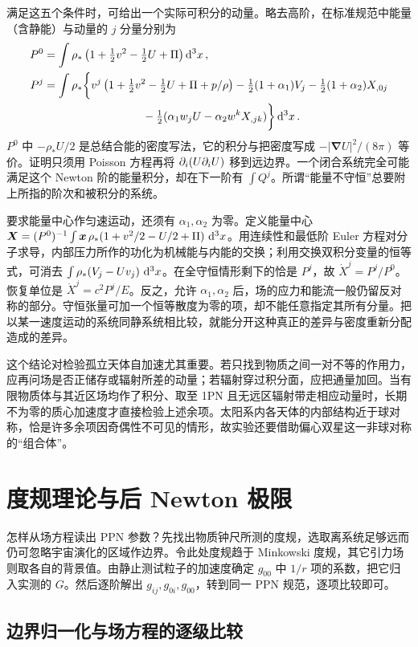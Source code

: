 满足这五个条件时，可给出一个实际可积分的动量。略去高阶，在标准规范中能量（含静能）与动量的 $j$ 分量分别为
\begin{align*}
 P^0&=\int\rho_*\left(1+\tfrac12v^2-\tfrac12 U+\Pi\right)\d[3]{x},\\
 P^j&=\int\rho_*\bigg\{ v^j\left(1+\tfrac12v^2-\tfrac12 U+\Pi+p/\rho\right)
       -\tfrac12(1+\alpha_1)V_j-\tfrac12(1+\alpha_2)X_{,0j}\\
    &\hspace{31mm}-\tfrac12(\alpha_1 w_jU-\alpha_2w^kX_{,jk})\bigg\}\d[3]{x}.
\end{align*}
$P^0$ 中 $-\rho_*U/2$ 是总结合能的密度写法，它的积分与把密度写成 $-|\bm\nabla U|^2/(8\pi)$ 等价。证明只须用 Poisson 方程再将 $\partial_i(U\partial_iU)$ 移到远边界。一个闭合系统完全可能满足这个 Newton 阶的能量积分，却在下一阶有 $\int Q^j$。所谓“能量不守恒”总要附上所指的阶次和被积分的系统。

要求能量中心作匀速运动，还须有 $\alpha_1,\alpha_2$ 为零。定义能量中心 $\bm X=(P^0)^{-1}\int \bm x\,\rho_*(1+v^2/2-U/2+\Pi)\,\dd[3]{x}$。用连续性和最低阶 Euler 方程对分子求导，内部压力所作的功化为机械能与内能的交换；利用交换双积分变量的恒等式，可消去 $\int\rho_*(V_j-Uv_j)\,\dd[3]{x}$。在全守恒情形剩下的恰是 $P^j$，故 $\dot X^j=P^j/P^0$。恢复单位是 $\dot X^j=c^2P^j/E$。反之，允许 $\alpha_1,\alpha_2$ 后，场的应力和能流一般仍留反对称的部分。守恒张量可加一个恒等散度为零的项，却不能任意指定其所有分量。把以某一速度运动的系统同静系统相比较，就能分开这种真正的差异与密度重新分配造成的差异。

这个结论对检验孤立天体自加速尤其重要。若只找到物质之间一对不等的作用力，应再问场是否正储存或辐射所差的动量；若辐射穿过积分面，应把通量加回。当有限物质体与其近区场均作了积分、取至 1PN 且无远区辐射带走相应动量时，长期不为零的质心加速度才直接检验上述余项。太阳系内各天体的内部结构近于球对称，恰是许多余项因奇偶性不可见的情形，故实验还要借助偏心双星这一非球对称的“组合体”。

\section{度规理论与后 Newton 极限}

怎样从场方程读出 PPN 参数？先找出物质钟尺所测的度规，选取离系统足够远而仍可忽略宇宙演化的区域作边界。令此处度规趋于 Minkowski 度规，其它引力场则取各自的背景值。由静止测试粒子的加速度确定 $g_{00}$ 中 $1/r$ 项的系数，把它归入实测的 $G$。然后逐阶解出 $g_{ij},g_{0i},g_{00}$，转到同一 PPN 规范，逐项比较即可。

\subsection{边界归一化与场方程的逐级比较}\label{sec:pn-source-stress}

